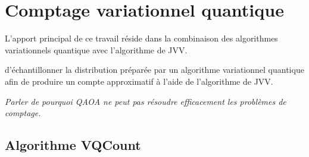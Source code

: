 \chapter{Comptage variationnel quantique}

L'apport principal de ce travail réside dans la combinaison des algorithmes variationnels quantique avec l'algorithme de JVV.



d'échantillonner la distribution préparée par un algorithme variationnel quantique afin de produire un compte approximatif à l'aide de l'algorithme de JVV. 

\textcolor{mydarkred}{\textit{Parler de pourquoi QAOA ne peut pas résoudre efficacement les problèmes de comptage.}}




\section{Algorithme VQCount}

